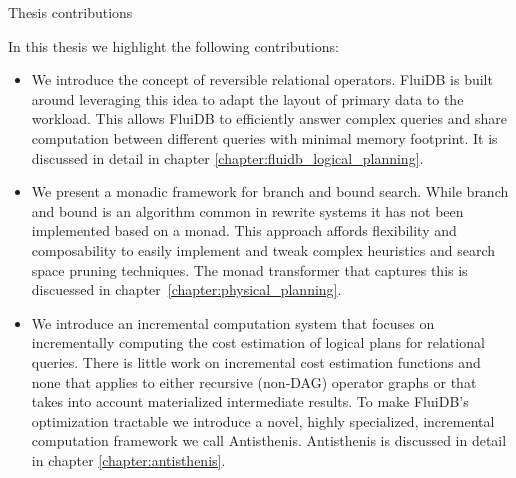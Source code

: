 \begin{corrected}{Thesis contributions}

In this thesis we highlight the following contributions:

\begin{itemize}
\item We introduce the concept of reversible relational
  operators. FluiDB is built around leveraging this idea to adapt the
  layout of primary data to the workload. This allows FluiDB to
  efficiently answer complex queries and share computation between
  different queries with minimal memory footprint. It is discussed in
  detail in chapter \ref{chapter:fluidb_logical_planning}.
\item We present a monadic framework for branch and bound
  search. While branch and bound is an algorithm common in rewrite
  systems it has not been implemented based on a monad. This approach
  affords flexibility and composability to easily implement and tweak
  complex heuristics and search space pruning techniques. The
   monad transformer that captures this is discuessed in
  chapter~\ref{chapter:physical_planning}.
\item We introduce an incremental computation system that focuses on
  incrementally computing the cost estimation of logical plans for
  relational queries. There is little work on incremental cost
  estimation functions and none that applies to either recursive
  (non-DAG) operator graphs or that takes into account materialized
  intermediate results. To make FluiDB's optimization tractable we
  introduce a novel, highly specialized, incremental computation
  framework we call Antisthenis. Antisthenis is discussed in detail in
  chapter \ref{chapter:antisthenis}.
\end{itemize}


\end{corrected}
